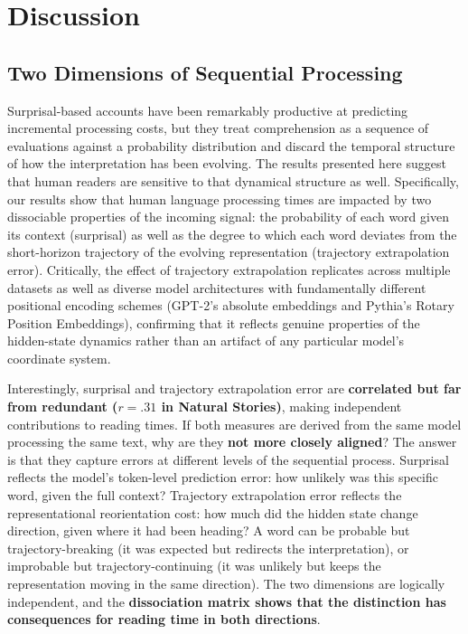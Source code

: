 \documentclass[12pt]{article}
\newcommand{\new}[1]{{\bfseries #1}}
\begin{document}
\FloatBarrier

\section{Discussion}

\subsection{Two Dimensions of Sequential Processing}

Surprisal-based accounts have been remarkably productive at predicting incremental processing costs, but they treat comprehension as a sequence of evaluations against a probability distribution and discard the temporal structure of how the interpretation has been evolving. The results presented here suggest that human readers are sensitive to that dynamical structure as well. Specifically, our results show that human language processing times are impacted by two dissociable properties of the incoming signal: the probability of each word given its context (surprisal) as well as the degree to which each word deviates from the short-horizon trajectory of the evolving representation (trajectory extrapolation error). Critically, the effect of trajectory extrapolation replicates across multiple datasets as well as diverse model architectures with fundamentally different positional encoding schemes (GPT-2's absolute embeddings and Pythia's Rotary Position Embeddings), confirming that it reflects genuine properties of the hidden-state dynamics rather than an artifact of any particular model's coordinate system.

Interestingly, surprisal and trajectory extrapolation error are \new{correlated but far from redundant ($r = .31$ in Natural Stories)}, making independent contributions to reading times. If both measures are derived from the same model processing the same text, why are they \new{not more closely aligned}? The answer is that they capture errors at different levels of the sequential process. Surprisal reflects the model's token-level prediction error: how unlikely was this specific word, given the full context? Trajectory extrapolation error reflects the representational reorientation cost: how much did the hidden state change direction, given where it had been heading? A word can be probable but trajectory-breaking (it was expected but redirects the interpretation), or improbable but trajectory-continuing (it was unlikely but keeps the representation moving in the same direction). The two dimensions are logically independent, and the \new{dissociation matrix shows that the distinction has consequences for reading time in both directions}.
\end{document}
